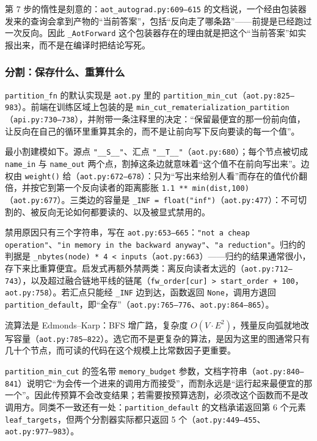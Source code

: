 第 7 步的惰性是刻意的：\texttt{aot\_autograd.py:609--615} 的文档说，一个经由包装器发来的查询会拿到产物的“当前答案”，包括“反向走了哪条路”——前提是已经跑过一次反向。因此 \texttt{\_AotForward} 这个包装器存在的理由就是把这个“当前答案”如实报出来，而不是在编译时把结论写死。

\subsubsection{分割：保存什么、重算什么}

\texttt{partition\_fn} 的默认实现是 \texttt{aot.py} 里的 \texttt{partition\_min\_cut}（\texttt{aot.py:825--983}）。前端在训练区域上包装的是 \texttt{min\_cut\_rematerialization\_partition}（\texttt{api.py:730--738}），并附带一条注释里的决定：“保留最便宜的那一份前向值，让反向在自己的循环里重算其余的，而不是让前向写下反向要读的每一个值”。

最小割建模如下。源点 \texttt{"\_\_S\_\_"}、汇点 \texttt{"\_\_T\_\_"}（\texttt{aot.py:680}）；每个节点被切成 \texttt{name\_in} 与 \texttt{name\_out} 两个点，割掉这条边就意味着“这个值不在前向写出来”。边权由 \texttt{weight()} 给（\texttt{aot.py:672--678}）：只为“写出来给别人看”而存在的值代价翻倍，并按它到第一个反向读者的距离膨胀 \texttt{1.1 ** min(dist,100)}（\texttt{aot.py:677}）。三类边的容量是 \texttt{\_INF = float("inf")}（\texttt{aot.py:477}）：不可切割的、被反向无论如何都要读的、以及被显式禁用的。

禁用原因只有三个字符串，写在 \texttt{aot.py:653--665}：\texttt{"not a cheap operation"}、\texttt{"in memory in the backward anyway"}、\texttt{"a reduction"}。归约的判据是 \texttt{\_nbytes(node) * 4 < inputs}（\texttt{aot.py:663}）——归约的结果通常很小，存下来比重算便宜。启发式再额外禁两类：离反向读者太远的（\texttt{aot.py:712--743}），以及超过融合链地平线的链尾（\texttt{fw\_order[cur] > start\_order + 100}，\texttt{aot.py:758}）。若汇点只能经 \texttt{\_INF} 边到达，函数返回 \texttt{None}，调用方退回 \texttt{partition\_default}，即“全存”（\texttt{aot.py:765--776}、\texttt{aot.py:864--865}）。

流算法是 Edmonds--Karp：BFS 增广路，复杂度 $O(V\cdot E^2)$，残量反向弧就地改写容量（\texttt{aot.py:785--822}）。选它而不是更复杂的算法，是因为这里的图通常只有几十个节点，而可读的代码在这个规模上比常数因子更重要。

\begin{tppitfall}
\texttt{partition\_min\_cut} 的签名带 \texttt{memory\_budget} 参数，文档字符串（\texttt{aot.py:840--841}）说明它“为会传一个进来的调用方而接受”，而割永远是“运行起来最便宜的那一个”。因此传预算不会改变结果；若需要按预算选割，必须改这个函数而不是改调用方。同类不一致还有一处：\texttt{partition\_default} 的文档承诺返回第 6 个元素 \texttt{leaf\_targets}，但两个分割器实际都只返回 5 个（\texttt{aot.py:449--455}、\texttt{aot.py:977--983}）。
\end{tppitfall}

